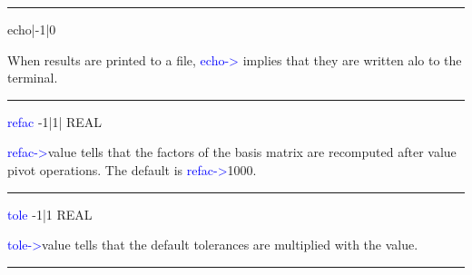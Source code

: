 \hrule
\vspace{0.3cm}
\noindent echo|-1|0 \tabto{3cm}   \tabto{5cm}    \tabto{7cm}
\begin{changemargin}{3cm}{0cm}
\noindent When results are printed to a file, \textcolor{blue}{echo->} implies that they are written alo to the terminal.
\end{changemargin}
\vspace{0.3cm}
\hrule
\vspace{0.3cm}
\noindent \textcolor{blue}{refac} \tabto{3cm} -1|1| \tabto{5cm}  REAL \tabto{7cm}
\begin{changemargin}{3cm}{0cm}
\noindent  \textcolor{blue}{refac->}value tells that the factors of the basis matrix are recomputed after value pivot operations.
The default is \textcolor{blue}{refac->}1000.
\end{changemargin}
\vspace{0.3cm}
\hrule
\vspace{0.3cm}
\noindent \textcolor{blue}{tole} \tabto{3cm} -1|1 \tabto{5cm}  REAL \tabto{7cm}
\begin{changemargin}{3cm}{0cm}
\noindent  \textcolor{blue}{tole->}value tells that the default tolerances are multiplied with the value.
\end {changemargin}
\hrule
\vspace{0.2cm}

